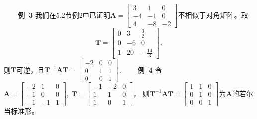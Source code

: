 \documentclass[compress,mathserif,cjk]{beamer}
\theoremstyle{remark}
\numberwithin{equation}{section}
\newcommand{\hei}{\bf}      %
\newcommand{\xiaoerhao}{\fontsize{18pt}{\baselineskip}\selectfont}  %
\begin{document}
\begin{CJK}{UTF8}{gbsn}
\begin{frame}
\ \ \ \ {\hei 例~3} 我们在5.2节例2中已证明$\bm A=\left[\begin{matrix}3&1&0\\-4&-1&0\\4&-8&-2\end{matrix}\right]$不相似于对角矩阵。取
$$\bm T=\left[\begin{matrix}0&3&\frac{3}2\\0&-6&0\\1&20&-\frac{14}3\end{matrix}\right],$$
则$\bm T$可逆，且$\bm T^{-1}\bm{AT}=\left[\begin{matrix}-2&0&0\\0&1&1\\0&0&1\end{matrix}\right]$.
\pause\vskip 5pt
\ \ \ \ {\hei 例~4} 令$\bm A=\left[\begin{matrix}-2&1&0\\-1&0&0\\-1&-1&1\end{matrix}\right],~\bm T=\left[\begin{matrix}-1&-2&0\\1&1&0\\1&0&1\end{matrix}\right]$，
则$\bm T^{-1}\bm{AT}=\left[\begin{matrix}1&1&0\\0&1&0\\0&0&1\end{matrix}\right]$为$\bm A$的若尔当标准形。
\end{frame}




\begin{frame}
\begin{center}
{\textcolor[rgb]{0.50,0.00,1.00}{\textbf{\xiaoerhao{Thanks for your attention!}}}}\bigskip
\end{center}
\end{frame}
\end{CJK}
\end{document}
